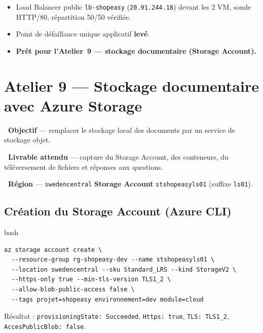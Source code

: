 \documentclass[11pt,a4paper]{article}
\newcommand{\emo}[1]{\raisebox{-0.14em}{\twemoji{#1}}}
\newcommand{\eTarget}{\emo{1f3af}}
\newcommand{\ePackage}{\emo{1f4e6}}
\newcommand{\eGlobe}{\emo{1f310}}
\newcommand{\code}[1]{\texttt{#1}}
\begin{document}
\begin{etatbox}
\begin{itemize}
  \item Load Balancer public \texttt{lb-shopeasy} (\texttt{20.91.244.18}) devant les 2 VM, sonde HTTP/80, répartition 50/50 vérifiée.
  \item Point de défaillance unique applicatif \textbf{levé}.
  \item \textbf{Prêt pour l'Atelier~9 — stockage documentaire (Storage Account).}
\end{itemize}
\end{etatbox}


\section{Atelier 9 — Stockage documentaire avec Azure Storage}

\begin{fiche}
\textbf{\eTarget~Objectif} — remplacer le stockage local des documents par un service de stockage objet.

\textbf{\ePackage~Livrable attendu} — capture du Storage Account, des conteneurs, du téléversement de fichiers et réponses aux questions.

\textbf{\eGlobe~Région} — \code{swedencentral} \quad\textbullet\quad \textbf{Storage Account} \code{stshopeasyls01} (suffixe \code{ls01}).
\end{fiche}

\subsection{Création du Storage Account (Azure CLI)}
\begin{codebox}{bash}
\begin{Verbatim}
az storage account create \
  --resource-group rg-shopeasy-dev --name stshopeasyls01 \
  --location swedencentral --sku Standard_LRS --kind StorageV2 \
  --https-only true --min-tls-version TLS1_2 \
  --allow-blob-public-access false \
  --tags projet=shopeasy environnement=dev module=cloud
\end{Verbatim}
\end{codebox}
{\small Résultat : \code{provisioningState: Succeeded}, \code{Https: true}, \code{TLS: TLS1\_2}, \code{AccesPublicBlob: false}.}
\end{document}

